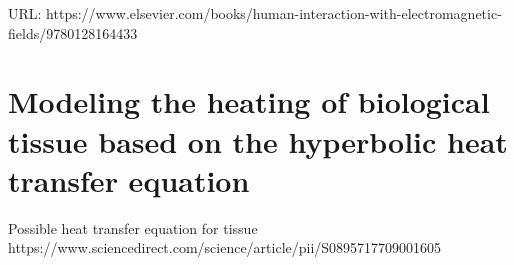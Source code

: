 \documentclass[12pt]{article}
\begin{document}
URL: https://www.elsevier.com/books/human-interaction-with-electromagnetic-fields/9780128164433

\section{Modeling the heating of biological tissue based on the hyperbolic heat transfer equation}
Possible heat transfer equation for tissue
https://www.sciencedirect.com/science/article/pii/S0895717709001605
\end{document}

